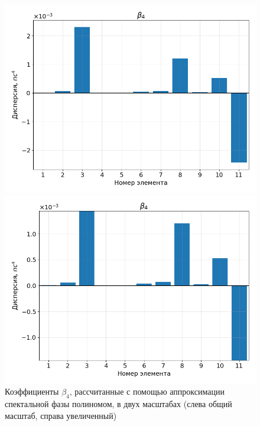 \documentclass[12pt]{article}
\begin{document}
\begin{figure}[h!]
    \centering
    \begin{minipage}[b]{0.5\textwidth}
        \includegraphics[width=\linewidth]{Images/Gauss Pulse Parabolic Profile/Беты/beta_4_full}
    \end{minipage}%
    \begin{minipage}[b]{0.5\textwidth}
        \includegraphics[width=\linewidth]{Images/Gauss Pulse Parabolic Profile/Беты/beta_4_cut}
    \end{minipage}

    \caption{Коэффициенты $\beta_4$, рассчитанные с помощью аппроксимации спектальной фазы полиномом,
     в двух масштабах (слева общий масштаб, справа увеличенный)}
    \label{fig:both}
\end{figure}
\end{document}
